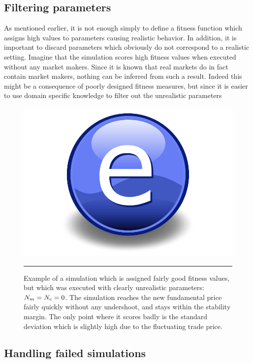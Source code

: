 \subsection{Filtering parameters}\label{section:filtering_parameters}
As mentioned earlier, it is not enough simply to define a fitness function which assigns high values to parameters causing realistic behavior. In addition, it is important to discard parameters which obviously do not correspond to a realistic setting. Imagine that the simulation scores high fitness values when executed without any market makers. Since it is known that real markets do in fact contain market makers, nothing can be inferred from such a result. Indeed this might be a consequence of poorly designed fitness measures, but since it is easier to use domain specific knowledge to filter out the unrealistic parameters


\begin{figure}[htbp]
	\centering
		\includegraphics{Figures/Electron.pdf}
		\rule{35em}{0.5pt}
	\caption{Example of a simulation which is assigned fairly good fitness values, but which was executed with clearly unrealistic parameters: $N_{m} = N_{c} = 0$. The simulation reaches the new fundamental price fairly quickly without any undershoot, and stays within the stability margin. The only point where it scores badly is the standard deviation which is slightly high due to the fluctuating trade price.}
	\label{fig:no_marketmakers}
\end{figure}


\subsection{Handling failed simulations}\label{section:failed_simulations}


